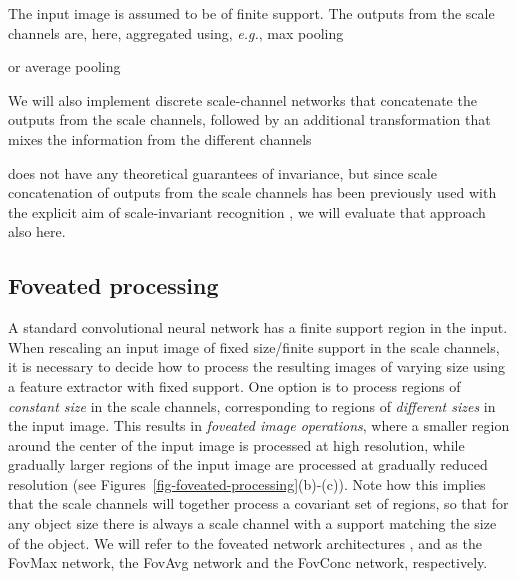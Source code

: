 \documentclass[twocolumn,runningheads]{svjour3}
\begin{document}
The input image  is assumed to
be of finite support. 
The outputs from the scale channels are, here,  
aggregated using, {\em e.g.\/}, max pooling

or average pooling

We will also implement discrete scale-channel networks that
concatenate the outputs from the scale channels, followed by an
additional transformation  that mixes the information from the different channels

 does not have any theoretical guarantees of invariance, but 
since scale concatenation of outputs from the scale channels has been
previously used with the explicit aim of scale-invariant recognition
\cite{XuXiaZhaYanZha14-arXiv}, we will evaluate that approach also here.

\subsection{Foveated processing}
\label{sec-foveated-operations}

A standard convolutional neural network  has a finite support region  in the input. 
When rescaling an input image of fixed size/finite support in the
scale channels, it is necessary to decide how to process the resulting
images of varying size using a feature extractor with fixed
support. One option is to process regions of {\em constant size\/} in
the scale channels, corresponding to regions of {\em different sizes\/}
in the input image.
This results in {\em foveated image operations\/}, where a smaller
region around the center of the input image is processed at high
resolution, while gradually larger regions of the input image are
processed at gradually reduced resolution (see
Figures~\ref{fig-foveated-processing}(b)-(c)). Note how this implies that the scale channels will together process a covariant set of regions, so that for any object size there is always a scale channel with a support matching the size of the object.
We will refer to the foveated network architectures ,
 and  as the FovMax network, the
FovAvg network and the FovConc network, respectively.
\end{document}
